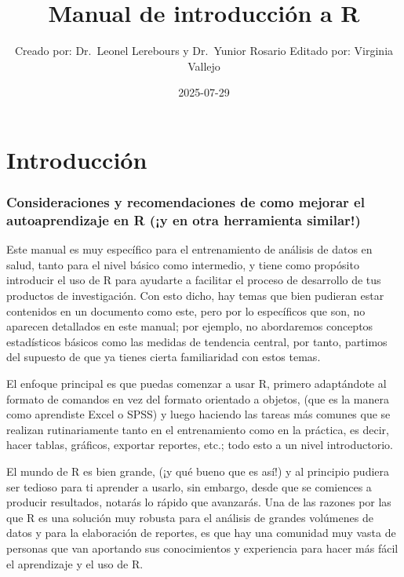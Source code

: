 \documentclass[
  letterpaper,
  DIV=11,
  numbers=noendperiod]{scrreprt}
\title{Manual de introducción a R}
\author{Creado por: Dr.~Leonel Lerebours y Dr.~Yunior Rosario Editado
por: Virginia Vallejo}
\date{2025-07-29}
\renewcommand*\contentsname{Contenido}
\newcommand\contentsname{Contenido}
\begin{document}
\maketitle

\renewcommand*\contentsname{Contenido}
{
\hypersetup{linkcolor=}
\setcounter{tocdepth}{2}
\tableofcontents
}


\chapter{Introducción}\label{introducciuxf3n}

\subsection{Consideraciones y recomendaciones de como mejorar el
autoaprendizaje en R (¡y en otra herramienta
similar!)}\label{consideraciones-y-recomendaciones-de-como-mejorar-el-autoaprendizaje-en-r-y-en-otra-herramienta-similar}

Este manual es muy específico para el entrenamiento de análisis de datos
en salud, tanto para el nivel básico como intermedio, y tiene como
propósito introducir el uso de R para ayudarte a facilitar el proceso de
desarrollo de tus productos de investigación. Con esto dicho, hay temas
que bien pudieran estar contenidos en un documento como este, pero por
lo específicos que son, no aparecen detallados en este manual; por
ejemplo, no abordaremos conceptos estadísticos básicos como las medidas
de tendencia central, por tanto, partimos del supuesto de que ya tienes
cierta familiaridad con estos temas.

El enfoque principal es que puedas comenzar a usar R, primero
adaptándote al formato de comandos en vez del formato orientado a
objetos, (que es la manera como aprendiste Excel o SPSS) y luego
haciendo las tareas más comunes que se realizan rutinariamente tanto en
el entrenamiento como en la práctica, es decir, hacer tablas, gráficos,
exportar reportes, etc.; todo esto a un nivel introductorio.

El mundo de R es bien grande, (¡y qué bueno que es así!) y al principio
pudiera ser tedioso para ti aprender a usarlo, sin embargo, desde que se
comiences a producir resultados, notarás lo rápido que avanzarás. Una de
las razones por las que R es una solución muy robusta para el análisis
de grandes volúmenes de datos y para la elaboración de reportes, es que
hay una comunidad muy vasta de personas que van aportando sus
conocimientos y experiencia para hacer más fácil el aprendizaje y el uso
de R.
\end{document}
